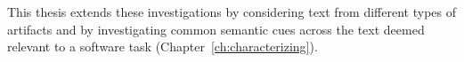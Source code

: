 This thesis extends these investigations
by considering text from different types of artifacts 
and by investigating common semantic cues across the text 
deemed relevant to a software task (Chapter~\ref{ch:characterizing}).





































